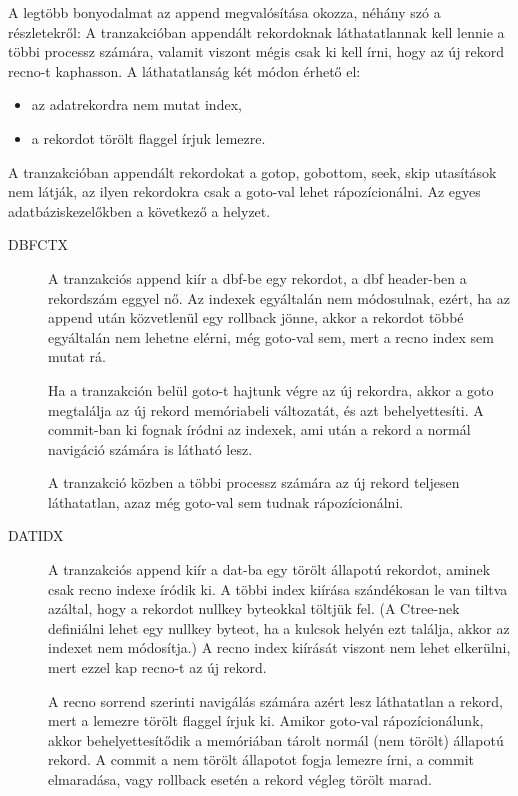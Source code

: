 {\small
A legtöbb bonyodalmat az append megvalósítása okozza, 
néhány szó a részletekről: A tranzakcióban appendált rekordoknak 
láthatatlannak kell lennie a többi processz számára, valamit viszont 
mégis csak ki kell írni, hogy az új rekord recno-t kaphasson. 
A láthatatlanság két módon érhető el: 

\begin{itemize}
\item az adatrekordra nem mutat index,
\item a rekordot törölt flaggel írjuk lemezre.
\end{itemize}
 
A tranzakcióban appendált rekordokat a gotop, gobottom, seek, skip 
utasítások nem látják, az ilyen rekordokra csak a goto-val lehet 
rápozícionálni. Az egyes adatbáziskezelőkben a következő a helyzet.

\begin{description}
\item[DBFCTX]
A tranzakciós append kiír a dbf-be egy rekordot, a dbf header-ben 
a rekordszám eggyel nő. Az indexek egyáltalán nem módosulnak, ezért, 
ha az append után közvetlenül egy rollback jönne, akkor a rekordot 
többé egyáltalán nem lehetne elérni, még goto-val sem, mert a recno 
index sem mutat rá.

Ha a tranzakción belül goto-t hajtunk végre az új rekordra, 
akkor a goto megtalálja az új rekord memóriabeli változatát, 
és azt behelyettesíti.  A commit-ban ki fognak íródni az indexek,
ami után a rekord a normál navigáció számára is látható lesz.

A tranzakció közben a többi processz számára az új rekord teljesen
láthatatlan, azaz még goto-val sem tudnak rápozícionálni.

\item[DATIDX]
A tranzakciós append kiír a dat-ba egy törölt állapotú rekordot,
aminek csak recno indexe íródik ki.  A többi index kiírása szándékosan
le van tiltva azáltal, hogy a rekordot nullkey byteokkal töltjük fel.
(A Ctree-nek definiálni lehet egy nullkey byteot, ha a kulcsok helyén
ezt találja, akkor az indexet nem módosítja.) A recno index kiírását
viszont nem lehet elkerülni, mert ezzel kap recno-t az új rekord.

A recno sorrend szerinti navigálás számára azért lesz láthatatlan
a rekord, mert a lemezre törölt flaggel írjuk ki. Amikor goto-val
rápozícionálunk, akkor  behelyettesítődik a memóriában tárolt
normál (nem törölt) állapotú rekord. A commit a nem törölt
állapotot fogja lemezre írni, a commit elmaradása, 
vagy rollback esetén a rekord végleg törölt marad.


\end{description}}
